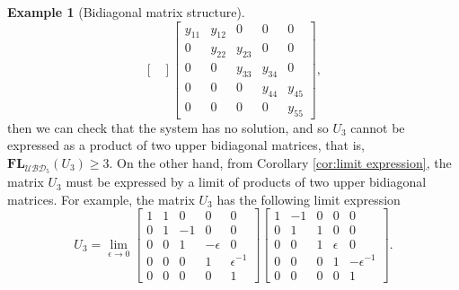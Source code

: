 \documentclass[reqno]{amsart}
\theoremstyle{definition}
\newtheorem{example}[theorem]{Example}
\numberwithin{equation}{section}
\begin{document}
\begin{example}[Bidiagonal matrix structure]
\begin{equation*}
\begin{bmatrix}
        \end{bmatrix}\begin{bmatrix}
            y_{11} & y_{12} & 0 & 0 & 0\\
            0 & y_{22} & y_{23} & 0 & 0\\
            0 & 0 & y_{33} & y_{34} & 0\\
            0 & 0 & 0 & y_{44} & y_{45}\\
            0 & 0 & 0 & 0 & y_{55}
        \end{bmatrix},
    \end{equation*}
    then we can check that the system has no solution, and so $U_3$ cannot be expressed as a product of two upper bidiagonal matrices, that is, $\mathbf{FL}_{\mathcal{UBD}_5}(U_3)\geq 3$. On the other hand, from Corollary \ref{cor:limit expression}, the matrix $U_3$ must be expressed by a limit of products of two upper bidiagonal matrices. For example, the matrix $U_3$ has the following limit expression
    \begin{equation*}
        U_3=\lim_{\epsilon \rightarrow 0} \begin{bmatrix}
            1 & 1 & 0 & 0 & 0\\
            0 & 1 & -1 & 0 & 0\\
            0 & 0 & 1 & -\epsilon & 0\\
            0 & 0 & 0 & 1 & \epsilon^{-1}\\
            0 & 0 & 0 & 0 & 1
        \end{bmatrix}
        \begin{bmatrix}
            1 & -1 & 0 & 0 & 0\\
            0 & 1 & 1 & 0 & 0\\
            0 & 0 & 1 & \epsilon & 0\\
            0 & 0 & 0 & 1 & -\epsilon^{-1}\\
            0 & 0 & 0 & 0 & 1
        \end{bmatrix}.
    \end{equation*}
\end{example}
\end{document}
